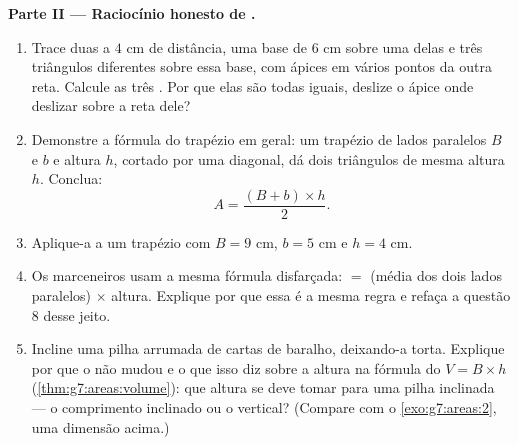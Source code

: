 \begin{problem}[{Problema de fim de semana --- uma ``demonstração''
famosa de que $64 = 65$, desmascarada por áreas e inclinações, com
pizzas e anéis de sobremesa}]
\medskip
\noindent\textbf{Parte II --- Raciocínio honesto de .}
\begin{enumerate}[resume]
  \item Trace duas  a $4$ cm de distância, uma base de
        $6$ cm sobre uma delas e três triângulos diferentes sobre essa
        base, com ápices em vários pontos da outra reta. Calcule as
        três . Por que elas são todas iguais, deslize o ápice
        onde deslizar sobre a reta dele?
  \item Demonstre a fórmula do trapézio em geral: um trapézio de lados
        paralelos $B$ e $b$ e altura $h$, cortado por uma diagonal, dá
        dois triângulos de mesma altura $h$. Conclua:
        \[
        A = \frac{(B + b) \times h}{2} .
        \]
  \item Aplique-a a um trapézio com $B = 9$ cm, $b = 5$ cm e
        $h = 4$ cm.
  \item Os marceneiros usam a mesma fórmula disfarçada:  $=$
        (média dos dois lados paralelos) $\times$ altura. Explique por
        que essa é a mesma regra e refaça a questão 8 desse jeito.
  \item Incline uma pilha arrumada de cartas de baralho, deixando-a
        torta. Explique por que o  não mudou e o que isso diz
        sobre a altura na fórmula do  $V = B \times h$
        (\cref{thm:g7:areas:volume}): que altura se deve tomar para uma
        pilha inclinada --- o comprimento inclinado ou o vertical?
        (Compare com o \cref{exo:g7:areas:2}, uma dimensão acima.)
\end{enumerate}


\end{problem}
